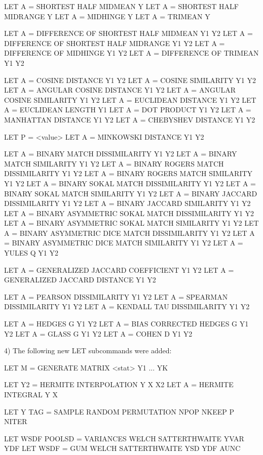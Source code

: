        LET A = SHORTEST HALF MIDMEAN Y
       LET A = SHORTEST HALF MIDRANGE Y
       LET A = MIDHINGE Y
       LET A = TRIMEAN Y

       LET A = DIFFERENCE OF SHORTEST HALF MIDMEAN  Y1 Y2
       LET A = DIFFERENCE OF SHORTEST HALF MIDRANGE Y1 Y2
       LET A = DIFFERENCE OF MIDHINGE Y1 Y2
       LET A = DIFFERENCE OF TRIMEAN Y1 Y2

       LET A = COSINE DISTANCE Y1 Y2
       LET A = COSINE SIMILARITY Y1 Y2
       LET A = ANGULAR COSINE DISTANCE Y1 Y2
       LET A = ANGULAR COSINE SIMILARITY Y1 Y2
       LET A = EUCLIDEAN DISTANCE Y1 Y2
       LET A = EUCLIDEAN LENGTH Y1
       LET A = DOT PRODUCT Y1 Y2
       LET A = MANHATTAN DISTANCE Y1 Y2
       LET A = CHEBYSHEV DISTANCE Y1 Y2

       LET P = <value>
       LET A = MINKOWSKI DISTANCE Y1 Y2

       LET A = BINARY MATCH DISSIMILARITY Y1 Y2
       LET A = BINARY MATCH SIMILARITY Y1 Y2
       LET A = BINARY ROGERS MATCH DISSIMILARITY Y1 Y2
       LET A = BINARY ROGERS MATCH SIMILARITY Y1 Y2
       LET A = BINARY SOKAL MATCH DISSIMILARITY Y1 Y2
       LET A = BINARY SOKAL MATCH SIMILARITY Y1 Y2
       LET A = BINARY JACCARD DISSIMILARITY Y1 Y2
       LET A = BINARY JACCARD SIMILARITY Y1 Y2
       LET A = BINARY ASYMMETRIC SOKAL MATCH DISSIMILARITY Y1 Y2
       LET A = BINARY ASYMMETRIC SOKAL MATCH SIMILARITY Y1 Y2
       LET A = BINARY ASYMMETRIC DICE MATCH DISSIMILARITY Y1 Y2
       LET A = BINARY ASYMMETRIC DICE MATCH SIMILARITY Y1 Y2
       LET A = YULES Q Y1 Y2

       LET A = GENERALIZED JACCARD COEFFICIENT Y1 Y2
       LET A = GENERALIZED JACCARD DISTANCE Y1 Y2

       LET A = PEARSON DISSIMILARITY Y1 Y2
       LET A = SPEARMAN DISSIMILARITY Y1 Y2
       LET A = KENDALL TAU DISSIMILARITY Y1 Y2

       LET A = HEDGES G Y1 Y2
       LET A = BIAS CORRECTED HEDGES G Y1 Y2
       LET A = GLASS G Y1 Y2
       LET A = COHEN D Y1 Y2

 4) The following new LET subcommands were added:

       LET M = GENERATE MATRIX <stat> Y1 ... YK

       LET Y2 = HERMITE INTERPOLATION Y X X2
       LET A  = HERMITE INTEGRAL Y X

       LET Y TAG = SAMPLE RANDOM PERMUTATION NPOP NKEEP P NITER

       LET WSDF POOLSD = VARIANCES WELCH SATTERTHWAITE YVAR YDF
       LET WSDF        = GUM       WELCH SATTERTHWAITE YSD  YDF  AUNC

